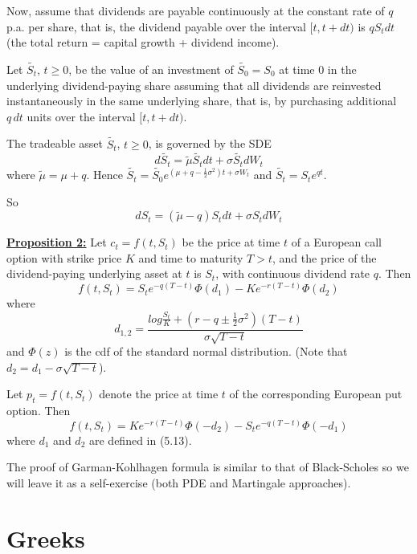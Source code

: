 \documentclass[11pt,a4paper]{book}
\theoremstyle{definition}\newtheorem{definition}{Definition}
\theoremstyle{definition}\newtheorem{fact}{Fact}
\theoremstyle{definition}\newtheorem{remark}{Remark}
\theoremstyle{definition}\newtheorem{ex}{Ex.}
\theoremstyle{definition}\newtheorem{project}{Project}
\theoremstyle{definition}\newtheorem{problem}{Problem}
\theoremstyle{definition}\newtheorem{example}{Example}
\numberwithin{theorem}{section}
\numberwithin{corollary}{chapter}
\numberwithin{assumption}{chapter}
\numberwithin{definition}{chapter}
\numberwithin{prop}{chapter}
\numberwithin{notation}{chapter}
\numberwithin{problem}{chapter}
\numberwithin{example}{chapter}
\numberwithin{fact}{chapter}
\numberwithin{ex}{chapter}
\begin{document}
Now, assume that dividends are payable continuously at the constant rate of $q$ p.a. per share, that is, the dividend payable over the interval $[t, t + dt)$ is $q S_t dt$ (the total return = capital growth + dividend income).

Let $\tilde{S_t}$, $t \geq 0$, be the value of an investment of $\tilde{S_0} = S_0$ at time 0 in the underlying dividend-paying share assuming that all dividends are reinvested instantaneously in the same underlying share, that is, by purchasing additional $q \, dt$ units over the interval $[t, t + dt)$.

The tradeable asset $\tilde{S_t}$, $t \geq 0$, is governed by the SDE
\begin{equation}
d\tilde{S_t} = \tilde{\mu} \tilde{S_t} dt + \sigma \tilde{S_t} dW_t
\end{equation}
where $\tilde{\mu} = \mu + q$. Hence $\tilde{S_t} = \tilde{S_0}e^{(\mu + q - \frac{1}{2} \sigma^2)t + \sigma W_t}$ and $\tilde{S_t} = S_t e^{qt}$.

So
$$ dS_t = (\tilde{\mu}-q)S_t dt + \sigma S_t dW_t $$

\vspace{15pt}
\textbf{\underline{Proposition 2:}} Let $c_t = f(t, S_t)$ be the price at time $t$ of a European call option with strike price $K$ and time to maturity $T>t$, and the price of the dividend-paying underlying asset at $t$ is $S_t$, with continuous dividend rate $q$. Then
\begin{equation}
f(t,S_t) = S_t e^{-q(T-t)} \Phi(d_1) - Ke^{-r(T-t)}\Phi(d_2)
\end{equation}
where
\begin{equation}
d_{1,2} = \frac{log\frac{S_t}{K}+(r -q \pm \frac{1}{2}\sigma^2)(T-t)}{\sigma \sqrt{T-t}}
\end{equation}
and $\Phi(z)$ is the cdf of the standard normal distribution. (Note that $d_2 = d_1 - \sigma \sqrt{T-t}$).

Let $p_t = f(t, S_t)$ denote the price at time $t$ of the corresponding European put option. Then
$$ f(t,S_t) = Ke^{-r(T-t)}\Phi(-d_2) - S_t e^{-q(T-t)} \Phi(-d_1) $$
where $d_1$ and $d_2$ are defined in (5.13).

The proof of Garman-Kohlhagen formula is similar to that of Black-Scholes so we will leave it as a self-exercise (both PDE and Martingale approaches).

\section{Greeks}
\end{document}
